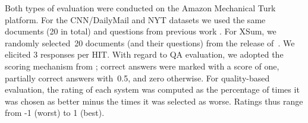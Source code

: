 \documentclass[11pt,a4paper]{article}
\makeatletter
\newcommand{\thickhline}{%
    \noalign {\ifnum 0=`}\fi \hrule height 1pt
    \futurelet \reserved@a \@xhline
}
\makeatother
\begin{document}
    
    
    
    
    \begin{table}[t]
        \caption{QA-based evaluation. Models with~${\dagger}$  are
            significantly different  from \textsc{BertSum} (using a paired
            student t-test; \mbox{$p < 0.05$}). Table cells are filled
            with --- whenever system output is not available.}
        \label{human-ext}
    \end{table}
    
    
    Both types of evaluation were conducted on the Amazon Mechanical
    Turk platform. For the CNN/DailyMail and NYT datasets we used the
    same documents (20 in total) and questions from previous work
    \cite{narayan2018ranking,yang19sumo}. For XSum, we randomly
    selected~20 documents (and their questions) from the release
    of~\citet{xsum}. We elicited 3 responses per HIT.  With regard to
    QA evaluation, we adopted the scoring mechanism from
    \citet{clarke2010discourse}; correct answers were marked with a
    score of one, partially correct answers with~0.5, and zero
    otherwise. For quality-based evaluation, the rating of each system
    was computed as the percentage of times it was chosen as better
    minus the times it was selected as worse. Ratings thus range from
    -1 (worst) to 1 (best).
    
\end{document}
